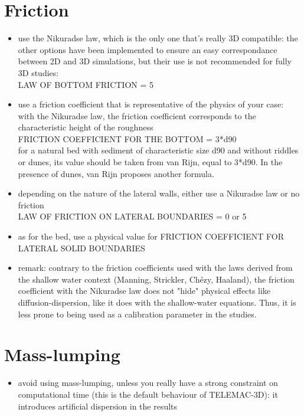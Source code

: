 \section{Friction}
\begin{itemize}
\item use the Nikuradse law, which is the only one that's really 3D compatible: the other options have been implemented to ensure an easy correspondance between 2D and 3D simulations, but their use is not recommended for fully 3D studies:\\
  LAW OF BOTTOM FRICTION = 5\\
\item use a friction coefficient that is representative of the physics of your case: with the Nikuradse law, the friction coefficient corresponds to the characteristic height of the roughness \\
  FRICTION COEFFICIENT FOR THE BOTTOM = 3*d90\\
  for a natural bed with sediment of characteristic size d90 and without riddles or dunes, its value should be taken from van Rijn, equal to 3*d90. In the presence of dunes, van Rijn proposes another formula.
\item depending on the nature of the lateral walls, either use a Nikuradse law or no friction \\
  LAW OF FRICTION ON LATERAL BOUNDARIES = 0 or 5
\item as for the bed, use a physical value for FRICTION COEFFICIENT FOR LATERAL SOLID BOUNDARIES
\item remark: contrary to the friction coefficients used with the laws derived from the shallow water context (Manning, Strickler, Chézy, Haaland),
  the friction coefficient with the Nikuradse law does not "hide" physical effects like diffusion-dispersion, like it does with the shallow-water equations.
  Thus, it is less prone to being used as a calibration parameter in the studies.
\end{itemize}

\section{Mass-lumping}
\begin{itemize}
\item avoid using mass-lumping, unless you really have a strong constraint on computational time (this is the default behaviour of TELEMAC-3D): it introduces artificial dispersion in the results
\end{itemize}

